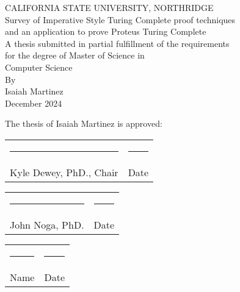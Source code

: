 \documentclass[12pt]{article}
\begin{document}
\begin{titlepage}
    \centering
    CALIFORNIA STATE UNIVERSITY, NORTHRIDGE\\
    [1.5in]
    Survey of Imperative Style Turing Complete proof techniques\\
    and an application to prove Proteus Turing Complete\\
    [1.5in]
    A thesis submitted in partial fulfillment of the requirements\\
    for the degree of Master of Science in\\
    Computer Science\\
    [0.5in]
    By\\
    [0.25in]
    Isaiah Martinez\\
    [1.5in]
    December 2024
\end{titlepage}

\newpage
\setcounter{page}{2}

\vspace*{3in}
\hspace*{0.88in}
The thesis of Isaiah Martinez is approved:

\vspace{1in}

\begin{center}
    \begin{tabular}{p{3in} p{1in}} %
        \rule{3in}{0.4pt} & \rule{1in}{0.4pt}\\
        Kyle Dewey, PhD., Chair & Date \\
    \end{tabular}
\end{center}

\begin{center}
    \begin{tabular}{p{3in} p{1in}} %
        \rule{3in}{0.4pt} & \rule{1in}{0.4pt}\\
        John Noga, PhD. & Date \\
    \end{tabular}
\end{center}

\begin{center}
    \begin{tabular}{p{3in} p{1in}} %
        \rule{3in}{0.4pt} & \rule{1in}{0.4pt}\\
        Name & Date \\
    \end{tabular}
\end{center}
\end{document}
